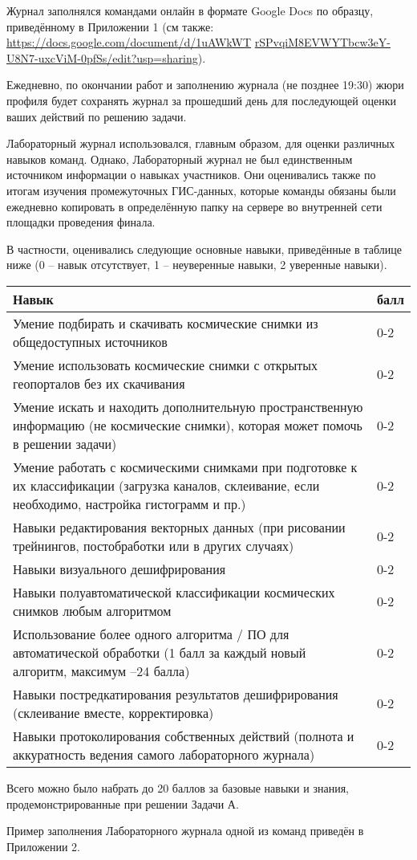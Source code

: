 Журнал заполнялся командами онлайн в формате Google Docs по образцу, приведённому в Приложении 1 (см также: \url{https://docs.google.com/document/d/1uAWkWT} \url{rSPvqiM8EVWYTbcw3eY-U8N7-uxcViM-0pfSs/edit?usp=sharing}).

Ежедневно, по окончании работ и заполнению журнала (не позднее 19:30) жюри профиля будет сохранять журнал за прошедший день для последующей оценки ваших действий по решению задачи.

Лабораторный журнал использовался, главным образом, для оценки различных навыков команд. Однако, Лабораторный журнал не был единственным источником информации о навыках участников. Они оценивались также по итогам изучения промежуточных ГИС-данных, которые команды обязаны были ежедневно копировать в определённую папку на сервере во внутренней сети площадки проведения финала.

В частности, оценивались следующие основные навыки, приведённые в таблице ниже (0 – навык отсутствует, 1 – неуверенные навыки, 2 уверенные навыки).

\begin{center}
    \begin{tabular}{|p{14cm}|l|}
        \hline
        Навык & балл \\
        \hline
        Умение подбирать и скачивать космические снимки из общедоступных источников & 0-2 \\
        \hline
        Умение использовать космические снимки с открытых геопорталов без их скачивания & 0-2 \\
        \hline
        Умение искать и находить дополнительную пространственную информацию (не космические снимки), которая может помочь в решении задачи) & 0-2 \\
        \hline
        Умение работать с космическими снимками при подготовке к их классификации (загрузка каналов, склеивание, если необходимо, настройка гистограмм и пр.) & 0-2 \\
        \hline
        Навыки редактирования векторных данных (при рисовании трейнингов, постобработки или в других случаях) & 0-2 \\
        \hline
        Навыки визуального дешифрирования & 0-2 \\
        \hline
        Навыки полуавтоматической классификации космических снимков любым алгоритмом & 0-2 \\
        \hline
        Использование более одного алгоритма / ПО для автоматической обработки (1 балл за каждый новый алгоритм, максимум –24 балла) & 0-2 \\
        \hline
        Навыки постредкатирования результатов дешифрирования (склеивание вместе, корректировка) & 0-2 \\
        \hline
        Навыки протоколирования собственных действий (полнота и аккуратность ведения самого лабораторного журнала) & 0-2 \\
        \hline
    \end{tabular}
\end{center}

Всего можно было набрать до 20 баллов за базовые навыки и знания, продемонстрированные при решении Задачи А.

Пример заполнения Лабораторного журнала одной из команд приведён в Приложении 2.

